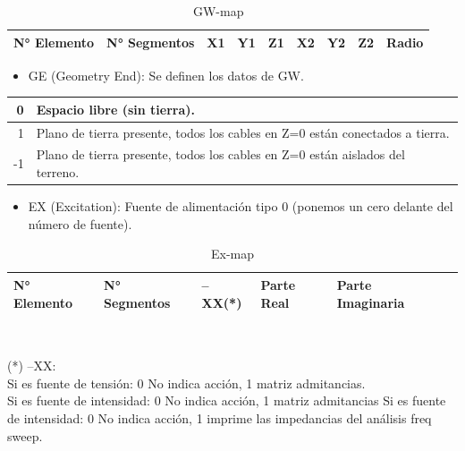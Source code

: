 \documentclass[12pt]{article}
\begin{document}
\begin{table}[H]
    \centering
    \begin{tabular}{|l|l|l|l|l|l|l|l|l|}
	\hline
	N° Elemento & N° Segmentos & X1 & Y1 & Z1 & X2 & Y2 & Z2 & Radio \\
	\hline
    \end{tabular}
    \caption{GW-map}
\end{table}

\begin{itemize}%
    \item GE (Geometry End): Se definen los datos de GW.
\end{itemize}

\begin{table}[H]
    \centering
    \begin{tabular}{|r|l|}
	\hline
	0 & Espacio libre (sin tierra).\\\hline
	1 & Plano de tierra presente, todos los cables en Z=0 est\'an conectados a tierra.\\\hline
	-1 & Plano de tierra presente, todos los cables en Z=0 est\'an aislados del terreno.\\
	\hline
    \end{tabular}
\end{table}

\begin{itemize}
    \item EX (Excitation): Fuente de alimentación tipo 0 (ponemos un cero delante del número de fuente).
\end{itemize}

\begin{table}[H]
    \centering
    \caption{Ex-map}
    \begin{tabular}{|l|l|l|l|l|l|}
	\hline
	N° Elemento & N° Segmentos & --XX(*) & Parte Real & Parte Imaginaria \\
	\hline
    \end{tabular}\\
    \raggedright
    \hspace{1.5em}(*) --XX:\\
    \hspace{3em} Si es fuente de tensi\'on: 0 No indica acci\'on, 1 matriz admitancias.\\
    \hspace{3em} Si es fuente de intensidad: 0 No indica acción, 1 matriz admitancias Si es fuente de intensidad: 0 No indica acción, 1 imprime las impedancias del análisis freq sweep.
\end{table}
\end{document}
